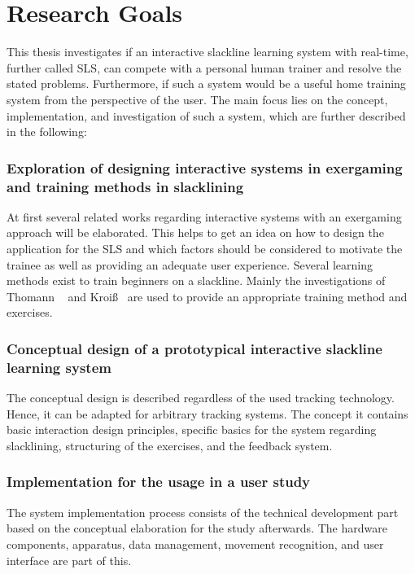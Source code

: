 \section{Research Goals}
This thesis investigates if an interactive slackline learning system with real-time, further called SLS, can compete with a personal human trainer and resolve the stated problems. 
Furthermore, if such a system would be a useful home training system from the perspective of the user.
The main focus lies on the concept, implementation, and investigation of such a system, which are further described in the following:

\subsubsection{Exploration of designing interactive systems in exergaming and training methods in slacklining}
At first several related works regarding interactive systems with an exergaming approach will be elaborated. 
This helps to get an idea on how to design the application for the SLS and which factors should be considered to motivate the trainee as well as providing an adequate user experience.
Several learning methods exist to train beginners on a slackline.
Mainly the investigations of Thomann ~\cite{Thomann2013-aa} and Kroiß~\cite{Kroiss2007-ab} are used to provide an appropriate training method and exercises. 

\subsubsection{Conceptual design of a prototypical interactive slackline learning system}
The conceptual design is described regardless of the used tracking technology.
Hence, it can be adapted for arbitrary tracking systems.
The concept it contains basic interaction design principles, specific basics for the system regarding slacklining, structuring of the exercises, and the feedback system.

\subsubsection{Implementation for the usage in a user study}
The system implementation process consists of the technical development part based on the conceptual elaboration for the study afterwards. 
The hardware components, apparatus, data management, movement recognition, and user interface are part of this.

